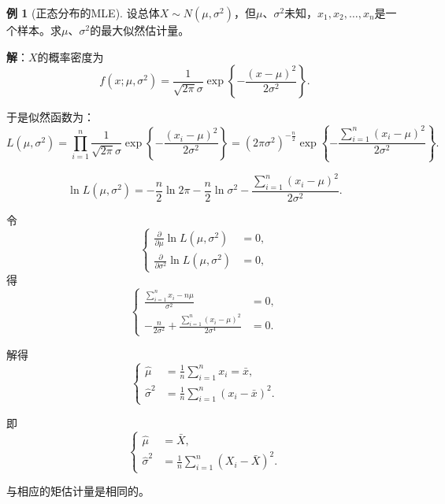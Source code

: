 \documentclass[11pt,a4paper]{report}
\theoremstyle{definition}
\newtheorem{example}{例}[chapter]
\begin{document}
\begin{example}[正态分布的MLE]
设总体$X\sim N(\mu,\sigma^{2})$，但$\mu$、$\sigma^{2}$未知，$x_{1},x_{2},\ldots,x_{n}$是一个样本。求$\mu$、$\sigma^{2}$的最大似然估计量。

\textbf{解}：$X$的概率密度为
\[
f(x;\mu,\sigma^{2})=\frac{1}{\sqrt{2\pi}\sigma}\exp\left\{-\frac{(x-\mu)^{2}}{2\sigma^{2}}\right\}.
\]

于是似然函数为：
\[
L(\mu,\sigma^{2})=\prod_{i=1}^{n}\frac{1}{\sqrt{2\pi}\sigma}\exp\left\{-\frac{(x_{i}-\mu)^{2}}{2\sigma^{2}}\right\}
=(2\pi\sigma^{2})^{-\frac{n}{2}}\exp\left\{-\frac{\sum_{i=1}^{n}(x_{i}-\mu)^{2}}{2\sigma^{2}}\right\}.
\]

\[
\ln L(\mu,\sigma^{2})=-\frac{n}{2}\ln 2\pi-\frac{n}{2}\ln\sigma^{2}-\frac{\sum_{i=1}^{n}(x_{i}-\mu)^{2}}{2\sigma^{2}}.
\]

令
\[
\left\{
\begin{aligned}
\frac{\partial}{\partial\mu}\ln L(\mu,\sigma^{2})&=0,\\[0.3em]
\frac{\partial}{\partial\sigma^{2}}\ln L(\mu,\sigma^{2})&=0,
\end{aligned}
\right.
\]
得
\[
\left\{
\begin{aligned}
\frac{\sum_{i=1}^{n}x_{i}-n\mu}{\sigma^{2}}&=0,\\[0.3em]
-\frac{n}{2\sigma^{2}}+\frac{\sum_{i=1}^{n}(x_{i}-\mu)^{2}}{2\sigma^{4}}&=0.
\end{aligned}
\right.
\]

解得
\[
\left\{
\begin{aligned}
\hat{\mu}&=\frac{1}{n}\sum_{i=1}^{n}x_{i}=\bar{x},\\[0.3em]
\hat{\sigma}^{2}&=\frac{1}{n}\sum_{i=1}^{n}(x_{i}-\bar{x})^{2}.
\end{aligned}
\right.
\]

即
\[
\left\{
\begin{aligned}
\hat{\mu}&=\bar{X},\\[0.3em]
\hat{\sigma}^{2}&=\frac{1}{n}\sum_{i=1}^{n}(X_{i}-\bar{X})^{2}.
\end{aligned}
\right.
\]

与相应的矩估计量是相同的。
\end{example}
\end{document}
